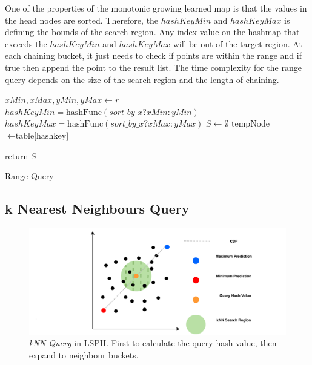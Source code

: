 One of the properties of the monotonic growing learned map is that the values in the head nodes are sorted. Therefore, the $hashKeyMin$ and $hashKeyMax$ is defining the bounds of the search region. Any index value on the hashmap that exceeds the $hashKeyMin$ and $hashKeyMax$ will be out of the target region. At each chaining bucket, it just needs to check if points are within the range and if true then append the point to the result list. The time complexity for the range query depends on the size of the search region and the length of chaining.  

\begin{algorithm}[H] \label{range_query}
\SetAlgoLined
{}
 $xMin, xMax, yMin, yMax\leftarrow{r}$\;
 $hashKeyMin = \text{hashFunc}(sort\_by\_x ? xMin : yMin)$\;
 $hashKeyMax = \text{hashFunc}(sort\_by\_x ? xMax : yMax)$\;
 $S\leftarrow{\emptyset}$\;
 {
 tempNode $\leftarrow{\text{table[hashkey]}}$\;
 }
 
 return $S$\;
 \caption{Range Query}
\end{algorithm}



\subsection{k Nearest Neighbours Query}

\begin{figure}[ht]
\centering
\includegraphics[scale=0.65]{Figures/knn.pdf}
\caption{\textit{kNN Query} in LSPH. First to calculate the query hash value, then expand to neighbour buckets.}
\label{fig:knn}
\end{figure}





